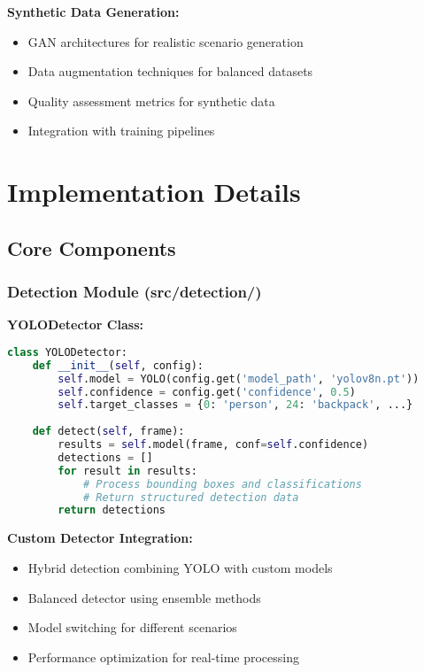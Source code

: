 \documentclass[12pt,a4paper]{article}
\begin{document}
\textbf{Synthetic Data Generation:}
\begin{itemize}
    \item GAN architectures for realistic scenario generation
    \item Data augmentation techniques for balanced datasets
    \item Quality assessment metrics for synthetic data
    \item Integration with training pipelines
\end{itemize}

\section{Implementation Details}

\subsection{Core Components}

\subsubsection{Detection Module (src/detection/)}

\textbf{YOLODetector Class:}
\begin{lstlisting}[language=Python, caption=YOLO Detection Implementation]
class YOLODetector:
    def __init__(self, config):
        self.model = YOLO(config.get('model_path', 'yolov8n.pt'))
        self.confidence = config.get('confidence', 0.5)
        self.target_classes = {0: 'person', 24: 'backpack', ...}
    
    def detect(self, frame):
        results = self.model(frame, conf=self.confidence)
        detections = []
        for result in results:
            # Process bounding boxes and classifications
            # Return structured detection data
        return detections
\end{lstlisting}

\textbf{Custom Detector Integration:}
\begin{itemize}
    \item Hybrid detection combining YOLO with custom models
    \item Balanced detector using ensemble methods
    \item Model switching for different scenarios
    \item Performance optimization for real-time processing
\end{itemize}
\end{document}
